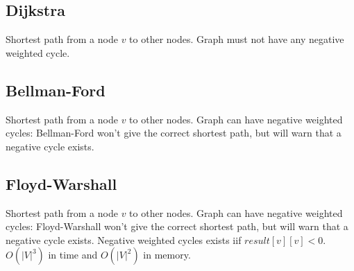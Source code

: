 \subsection{Dijkstra}
Shortest path from a node $v$ to other nodes. Graph must not have any negative weighted cycle.\\


\subsection{Bellman-Ford\label{BellmanFord}}
Shortest path from a node $v$ to other nodes. Graph can have negative weighted cycles: Bellman-Ford won't give the correct shortest path, but will warn that a negative cycle exists. 

\subsection{Floyd-Warshall}
Shortest path from a node $v$ to other nodes. Graph can have negative weighted cycles: Floyd-Warshall won't give the correct shortest path, but will warn that a negative cycle exists. Negative weighted cycles exists iif $result[v][v]<0$. $O(|V|^3)$ in time and $O(|V|^2)$ in memory.\\
